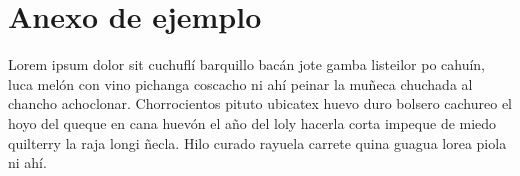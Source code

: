 \chapter{Anexo de ejemplo}
\label{apendice:anexo1}

Lorem ipsum dolor sit cuchufl\'i barquillo bac\'an jote gamba listeilor po cahu\'in, luca mel\'on con vino pichanga coscacho ni ah\'i peinar la muñeca chuchada al chancho achoclonar. Chorrocientos pituto ubicatex huevo duro bolsero cachureo el hoyo del queque en cana huev\'on el año del loly hacerla corta impeque de miedo quilterry la raja longi ñecla. Hilo curado rayuela carrete quina guagua lorea piola ni ah\'i.